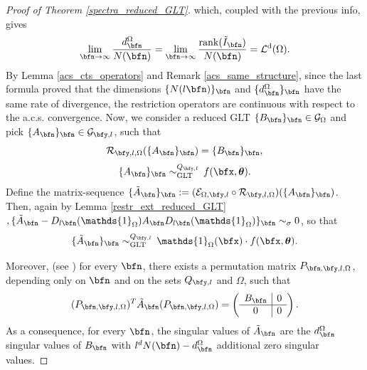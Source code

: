 \documentclass{amsart}
\DeclareMathOperator{\Ld}{\mathcal{L}^d}
\newcommand{\bftheta}{{\boldsymbol\theta}}
\begin{document}
\begin{proof}[Proof of Theorem \ref{spectra_reduced_GLT}]
    which, coupled with the previous info, gives
    \begin{equation*}
        \lim\limits_{\bfn\to\infty}\frac{d_\bfn^{\Omega}}{N(\bfn)}=\lim\limits_{\bfn\to\infty}\frac{\mathrm{rank}(\tilde{I}_\bfn)}{N(\bfn)}=\Ld(\Omega).
    \end{equation*}
    By Lemma \ref{acs_cts_operators} and Remark \ref{acs_same_structure}, since the last formula proved that the dimensions $\{N(l\bfn)\}_\bfn$ and $\{d_\bfn^\Omega\}_\bfn$ have the same rate of divergence, the restriction operators are continuous with respect to the a.c.s. convergence.
    Now, we consider a reduced GLT $\{B_{\bfn}\}_\bfn\in\mathcal{G}_{\Omega}$ and pick $\{A_\bfn\}_\bfn\in\mathcal{G}_{\bfy,l}$, such that 
    \begin{equation*}
        \mathcal{R}_{\bfy,l,\Omega}(\{A_\bfn\}_\bfn)=\{B_\bfn\}_\bfn,
    \end{equation*}
    \begin{equation*}
         \{A_{\bfn}\}_{\bfn}\sim_{\mathrm{GLT}}^{Q_{\bfy,l}}\,f(\bfx,\bftheta).
    \end{equation*}
    Define the matrix-sequence $\{\tilde{A}_\bfn\}_\bfn:=(\mathcal{E}_{\Omega,\bfy,l}\circ\mathcal{R}_{\bfy,l,\Omega})(\{A_\bfn\}_\bfn)$. Then, again by Lemma \ref{restr_ext_reduced_GLT}$, \{\tilde{A}_\bfn-D_{l\bfn}(\mathds{1}_\Omega)A_\bfn D_{l\bfn}(\mathds{1}_{\Omega})\}_\bfn\sim_{\sigma}0$, so that 
    \begin{equation*}
        \{\tilde{A}_\bfn\}_\bfn\sim_{\mathrm{GLT}}^{Q_{\bfy,l}}\,\mathds{1}_{\Omega}(\bfx)\cdot f(\bfx,\bftheta).
    \end{equation*}
    
    Moreover, (see \cite[Lemma 4.3]{Barb}) for every $\bfn$, there exists a permutation matrix $P_{\bfn,\bfy,l,\Omega}$, depending only on $\bfn$ and on the sets $Q_{\bfy,l}$ and $\Omega$, such that
    \begin{equation*}
        (P_{\bfn,\bfy,l,\Omega})^T\tilde{A}_\bfn (P_{\bfn,\bfy,l,\Omega})=\left( 
    \begin{array}{c|c} 
      B_\bfn & 0 \\ 
      \hline 
      0 & 0 
    \end{array} 
    \right).
    \end{equation*}
    As a consequence, for every $\bfn$, the singular values of $\tilde{A}_\bfn$ are the $d_\bfn^{\Omega}$ singular values of $B_\bfn$ with $l^dN(\bfn)-d_\bfn^{\Omega}$ additional zero singular values. 


\end{proof}
\end{document}
